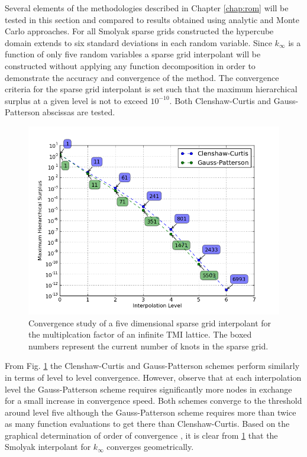 Several elements of the methodologies described in Chapter \ref{chap:rom} will be tested in this section and compared to results obtained using analytic and Monte Carlo approaches. For all Smolyak sparse grids constructed the hypercube domain extends to six standard deviations in each random variable. Since $k_{\infty}$ is a function of only five random variables a sparse grid interpolant will be constructed without applying any function decomposition in order to demonstrate the accuracy and convergence of the method. The convergence criteria for the sparse grid interpolant is set such that the maximum hierarchical surplus at a given level is not to exceed $10^{-10}$. Both Clenshaw-Curtis and Gauss-Patterson abscissas are tested. 
\begin{figure}
\caption{ \label{fig:kinf_sg_convergence}
Convergence study of a five dimensional sparse grid interpolant for the  multiplcation factor of an infinite TMI lattice. The boxed numbers represent the current number of knots in the sparse grid.}
 \begin{center}
  \includegraphics[scale=.75]{./Chapter3/kinf_sparse_grid_convergence.png}
 \end{center}
\end{figure}

From Fig. \ref{fig:kinf_sg_convergence} the Clenshaw-Curtis and Gauss-Patterson schemes perform similarly in terms of level to level convergence. However, observe that at each interpolation level the Gauss-Patterson scheme requires significantly more nodes in exchange for a small increase in convergence speed. Both schemes converge to the threshold around level five although the Gauss-Patterson scheme requires more than twice as many function evaluations to get there than Clenshaw-Curtis. Based on the graphical determination of order of convergence \cite{Boyd}, it is clear from \ref{fig:kinf_sg_convergence} that the Smolyak interpolant for $k_{\infty}$ converges geometrically.

